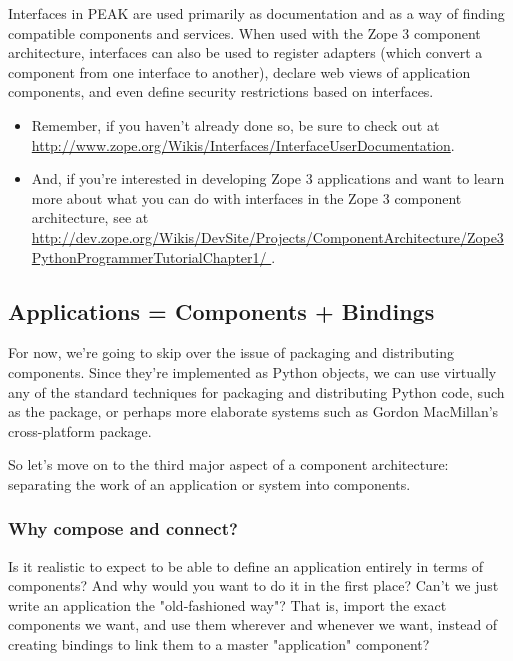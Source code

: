 Interfaces in PEAK are used primarily as documentation and as a way of finding
compatible components and services.  When used with the Zope 3 component
architecture, interfaces can also be used to register adapters (which convert
a component from one interface to another), declare web views of application
components, and even define security restrictions based on interfaces.  

\begin{seealso}
\begin{itemize}

\item Remember, if you haven't already done so, be sure to check out
 at 
\url{http://www.zope.org/Wikis/Interfaces/InterfaceUserDocumentation}.  

\item And, if you're interested in developing Zope 3 applications and want to
learn more about what you can do with interfaces in the Zope 3 component
architecture, see  at \url{http://dev.zope.org/Wikis/DevSite/Projects/ComponentArchitecture/Zope3PythonProgrammerTutorialChapter1/
}.

\end{itemize}
\end{seealso}


\subsection{Applications = Components + Bindings}

For now, we're going to skip over the issue of packaging and distributing
components.  Since they're implemented as Python objects, we can use virtually
any of the standard techniques for packaging and distributing Python code,
such as the  package, or perhaps more elaborate systems such
as Gordon MacMillan's cross-platform  package.

So let's move on to the third major aspect of a component architecture:
separating the work of an application or system into components.


\subsubsection{Why compose and connect?}

Is it realistic to expect to be able to define an application entirely in
terms of components?  And why would you want to do it in the first place?
Can't we just write an application the "old-fashioned way"?  That is,
import the exact components we want, and use them wherever and whenever
we want, instead of creating bindings to link them to a master "application"
component?

